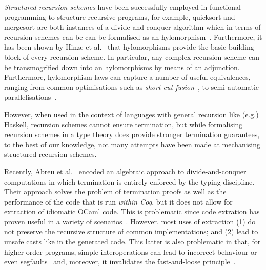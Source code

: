 \documentclass[ a4paper, UKenglish, cleveref, autoref, thm-restate]{lipics-v2021}
\begin{document}
\emph{Structured recursion schemes} have been successfully employed in
functional programming to structure recursive programs, for example, quicksort
and mergesort are both instances of a divide-and-conquer algorithm which in
terms of recursion schemes can be can be formalised as an
hylomorphism~\cite{MeijerFP91, HuIT96}. Furthermore, it has been shown by Hinze
et al.~\cite{HinzeWG15} that hylomorphisms provide the basic building block of
every recursion scheme. In particular, any complex recursion scheme can be
transmogrified down into an hylomorphisms by means of an adjunction.
Furthermore, hylomorphism laws can capture a number of useful equivalences,
ranging from common optimisations such as \emph{short-cut
fusion}~\cite{TakanoM95}, to semi-automatic
parallelisations~\cite{Gibbons96:Third, farmsCastro}.

However, when used in the context of languages with general recursion like
(e.g.) Haskell, recursion schemes cannot ensure termination, but while
formalising recursion schemes in a type theory does provide stronger termination
guarantees, to the best of our knowledge, not many attempts have been made at
mechanising structured recursion schemes.

Recently, Abreu et al.~\cite{AbreuDHJMS23} encoded an algebraic approach to
divide-and-conquer computations in which termination is entirely enforced by the
typing discipline. Their approach solves the problem of termination proofs as
well as the performance of the code that is run \emph{within Coq}, but it does
not allow for extraction of idiomatic OCaml code. This is problematic since code
extration has proven useful in a variety of scenarios~\cite{OnoHTNH11,
Larchey-Wendling23, MiculanP12, Sakaguchi20}.  However, most uses of extraction
(1) do not preserve the recursive structure of common implementations; and (2)
lead to unsafe casts like  in the generated code. This latter
is also problematic in that, for higher-order programs, simple interoperations
can lead to incorrect behaviour or even segfaults~\cite{forster:hal-04329663}
and, moreover, it invalidates the fast-and-loose
principle~\cite{DanielssonHJG06}.
\end{document}
